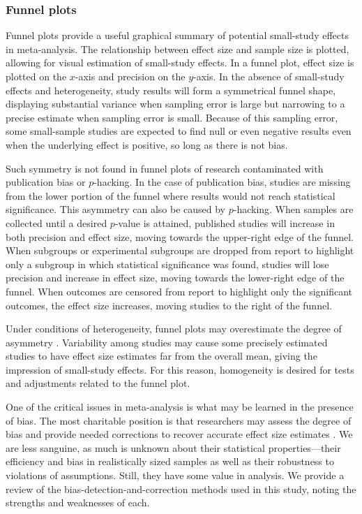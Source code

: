 \documentclass[man, mask]{apa6}
\begin{document}
\subsubsection{Funnel plots}
Funnel plots provide a useful graphical summary of potential small-study effects in meta-analysis.  The relationship between effect size and sample size is plotted, allowing for visual estimation of small-study effects. In a funnel plot, effect size is plotted on the $x$-axis and precision on the $y$-axis. In the absence of small-study effects and heterogeneity, study results will form a symmetrical funnel shape, displaying substantial variance when sampling error is large but narrowing to a precise estimate when sampling error is small. Because of this sampling error, some small-sample studies are expected to find null or even negative results even when the underlying effect is positive, so long as there is not bias. 

Such symmetry is not found in funnel plots of research contaminated with publication bias or $p$-hacking.  In the case of publication bias, studies are missing from the lower portion of the funnel where results would not reach statistical significance. This asymmetry can also be caused by $p$-hacking. When samples are collected until a desired $p$-value is attained, published studies will increase in both precision and effect size, moving towards the upper-right edge of the funnel. When subgroups or experimental subgroups are dropped from report to highlight only a subgroup in which statistical significance was found, studies will lose precision and increase in effect size, moving towards the lower-right edge of the funnel. When outcomes are censored from report to highlight only the significant outcomes, the effect size increases, moving studies to the right of the funnel. 

Under conditions of heterogeneity, funnel plots may overestimate the degree of asymmetry \citep{Terrin:etal:2003}. Variability among studies may cause some precisely estimated studies to have effect size estimates far from the overall mean, giving the impression of small-study effects. For this reason, homogeneity is desired for tests and adjustments related to the funnel plot.

One of the critical issues in meta-analysis is what may be learned in the presence of bias. The most charitable position is that researchers may assess the degree of bias and provide needed corrections to recover accurate effect size estimates \citep[e.g.,][]{Duval:Tweedie:2000,Simonsohn:etal:2014b}.  We are less sanguine, as much is unknown about their statistical properties---their efficiency and bias in realistically sized samples as well as their robustness to violations of assumptions.  Still, they have some value in analysis. We provide a review of the bias-detection-and-correction methods used in this study, noting the strengths and weaknesses of each. 
\end{document}
